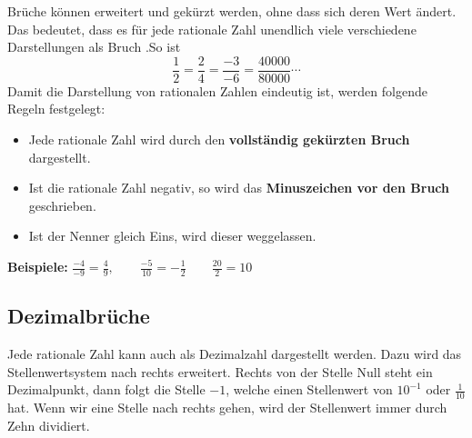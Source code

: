 Brüche können erweitert und gekürzt werden, ohne dass sich deren Wert ändert. Das bedeutet, dass es für jede rationale Zahl unendlich viele verschiedene Darstellungen als Bruch .So ist
\[
  \frac{1}{2} = \frac{2}{4} = \frac{-3}{-6} = \frac{40000}{80000} \cdots
\]
Damit die Darstellung von rationalen Zahlen eindeutig ist, werden folgende Regeln festgelegt:
\begin{itemize}[noitemsep]
  \item Jede rationale Zahl wird durch den \textbf{vollständig gekürzten Bruch} dargestellt.
  \item Ist die rationale Zahl negativ, so wird das \textbf{Minuszeichen vor den Bruch} geschrieben.
  \item Ist der Nenner gleich Eins, wird dieser weggelassen.
\end{itemize}
\begin{example}
  \textbf{Beispiele:} $\displaystyle \frac{-4}{-9} = \frac{4}{9}, \qquad \frac{-5}{10} = -\frac{1}{2} \qquad \frac{20}{2} = 10$
\end{example}

\subsection{Dezimalbrüche}

Jede rationale Zahl kann auch als Dezimalzahl dargestellt werden. Dazu wird das Stellenwertsystem nach rechts erweitert. Rechts von der Stelle Null steht ein Dezimalpunkt, dann folgt die Stelle $-1$, welche einen Stellenwert von $10^{-1}$ oder $\frac{1}{10}$ hat. Wenn wir eine Stelle nach rechts gehen, wird der Stellenwert immer durch Zehn dividiert.

